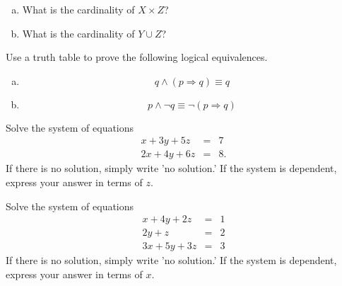 \documentclass[12pt]{amsart}
\begin{document}
\begin{thm}[10 Points]
  \begin{enumerate}[(a)]
  \item
    What is the cardinality of $X \times Z$?
    \vspace{1in}
  \item
    What is the cardinality of $Y \cup Z$?
    \vspace{1in}
  \end{enumerate}
\end{thm}
\newpage

\begin{thm}[10 Points]\label{ex9}
  Use a truth table to prove the following logical equivalences.
  \begin{enumerate}[(a)]
  \item
    $$q \wedge (p \Rightarrow q) \equiv q$$
    \vspace{2in}
  \item
    $$p \wedge \neg q \equiv \neg(p \Rightarrow q)$$
    \vspace{2in}
  \end{enumerate}
\end{thm}

\newpage
\begin{thm}[15 Points]\label{ex2}
  Solve the system of equations
  \begin{eqnarray*}
    x + 3y + 5z &=& 7\\
    2x + 4y + 6z &=& 8.
  \end{eqnarray*}
  If there is no solution, simply write 'no solution.'  If the system is dependent, express your answer in terms of $z$.
  \vspace{2in}
\end{thm}

\newpage

\begin{thm}[15 Points]\label{ex3}
  Solve the system of equations
  \begin{eqnarray*}
    x + 4y + 2z &=& 1\\
    2y + z &=& 2\\
    3x + 5y + 3z &=& 3
  \end{eqnarray*}
  If there is no solution, simply write 'no solution.'  If the system is dependent, express your answer in terms of $x$.
\end{thm}

\newpage
\end{document}
